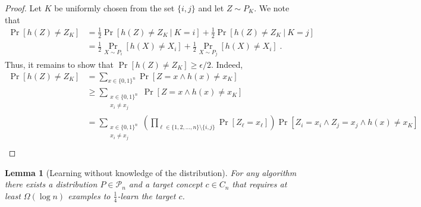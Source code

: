 \documentclass[12pt]{article}
\newtheorem{lemma}[proposition]{Lemma}
\renewcommand{\P}{\mathcal{P}}
\begin{document}
\begin{proof}
Let $K$ be uniformly chosen from the set $\{i,j\}$ and let $Z \sim P_K$.
We note that
\begin{align*}
\Pr[h(Z) \neq Z_K]
& = \frac{1}{2} \Pr[h(Z) \neq Z_K ~|~ K = i ] + \frac{1}{2} \Pr[h(Z) \neq Z_K ~|~ K = j ] \\
& = \frac{1}{2}\Pr_{X \sim P_i}[h(X) \neq X_i] + \frac{1}{2} \Pr_{X \sim P_j}[h(X) \neq X_i] \; .
\end{align*}
Thus, it remains to show that $\Pr[h(Z) \neq Z_K] \ge \epsilon/2$. Indeed,
\begin{align*}
\Pr[h(Z) \neq Z_K]
& = \sum_{x \in \{0,1\}^n} \Pr[Z = x \wedge h(x) \neq x_K ] \\
& \ge \sum_{\substack{x \in \{0,1\}^n \\ x_i \neq x_j}} \Pr[Z = x \wedge h(x) \neq x_K ] \\
& = \sum_{\substack{x \in \{0,1\}^n \\ x_i \neq x_j}} \left( \prod_{\ell \in \{1,2,\dots, n\} \setminus \{i,j\}} \Pr[Z_\ell = x_\ell] \right)  \Pr[Z_i = x_i \wedge Z_j = x_j \wedge h(x) \neq x_K ] \\
\end{align*}
\end{proof}

\begin{lemma}[Learning without knowledge of the distribution]
For any algorithm there exists a distribution $P \in \P_n$
and a target concept $c \in C_n$ that requires at least $\Omega(\log n)$
examples to $\frac{1}{4}$-learn the target $c$.
\end{lemma}
\end{document}
